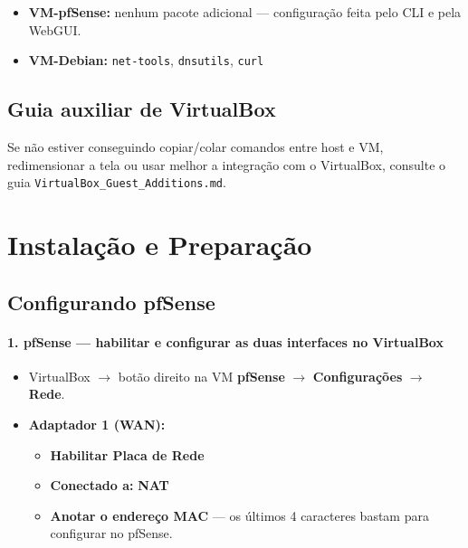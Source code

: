 \begin{itemize}
  \item \textbf{VM-pfSense:} nenhum pacote adicional --- configuração feita pelo CLI e pela WebGUI.
  \item \textbf{VM-Debian:} \texttt{net-tools}, \texttt{dnsutils}, \texttt{curl}
\end{itemize}

\subsection{Guia auxiliar de VirtualBox}

\begin{notebox}
Se não estiver conseguindo copiar/colar comandos entre host e VM, redimensionar a tela ou usar melhor a integração com o VirtualBox, consulte o guia \texttt{VirtualBox\_Guest\_Additions.md}.
\end{notebox}

\section{Instalação e Preparação}

\subsection{Configurando pfSense}

\paragraph{1. pfSense --- habilitar e configurar as duas interfaces no VirtualBox}

\begin{itemize}
  \item VirtualBox $\rightarrow$ botão direito na VM \textbf{pfSense} $\rightarrow$ \textbf{Configurações} $\rightarrow$ \textbf{Rede}.
  \item \textbf{Adaptador 1 (WAN):}
  \begin{itemize}
    \item \textbf{Habilitar Placa de Rede}
    \item \textbf{Conectado a:} \textbf{NAT}
    \item \textbf{Anotar o endereço MAC} --- os últimos 4 caracteres bastam para configurar no pfSense.
  \end{itemize}
\end{itemize}


